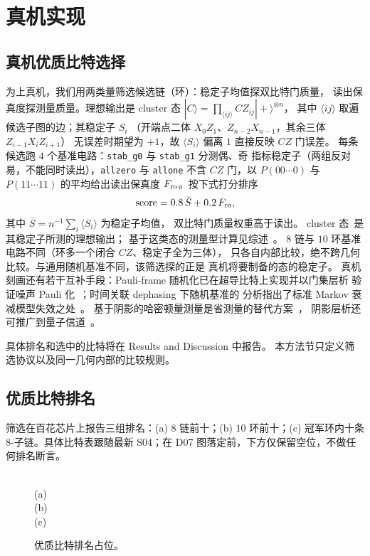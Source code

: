 \section{真机实现}
\label{sec:hardware}

\subsection{真机优质比特选择}
\label{sec:premium}

为上真机，我们用两类量筛选候选链（环）：稳定子均值探双比特门质量，
读出保真度探测量质量。理想输出是 cluster 态
$|C\rangle=\prod_{\langle ij\rangle}CZ_{ij}|+\rangle^{\otimes n}$，
其中 $\langle ij\rangle$ 取遍候选子图的边；其稳定子 $S_i$
（开端点二体 $X_0Z_1$、$Z_{n-2}X_{n-1}$，其余三体 $Z_{i-1}X_iZ_{i+1}$）
无误差时期望为 $+1$，故 $\langle S_i\rangle$ 偏离 $1$ 直接反映 $CZ$ 门误差。
每条候选跑 $4$ 个基准电路：\texttt{stab\_g0} 与 \texttt{stab\_g1} 分测偶、奇
指标稳定子（两组反对易，不能同时读出），\texttt{allzero} 与 \texttt{allone}
不含 $CZ$ 门，以 $P(00\cdots0)$ 与 $P(11\cdots11)$ 的平均给出读出保真度
$F_{\rm ro}$。按下式打分排序
\begin{equation}
{\rm score}=0.8\,\bar{S}+0.2\,F_{\rm ro},
\end{equation}
其中 $\bar{S}=n^{-1}\sum_i\langle S_i\rangle$ 为稳定子均值，
双比特门质量权重高于读出。
cluster 态~\cite{raussendorf2001oneway}是其稳定子所测的理想输出；
基于这类态的测量型计算见综述~\cite{briegel2009measurement}。
$8$ 链与 $10$ 环基准电路不同（环多一个闭合 $CZ$、稳定子全为三体），
只各自内部比较，绝不跨几何比较。与通用随机基准不同，该筛选探的正是
真机将要制备的态的稳定子。
真机刻画还有若干互补手段：Pauli-frame 随机化已在超导比特上实现并以门集层析
验证噪声 Pauli 化~\cite{ware2021experimental}；时间关联 dephasing 下随机基准的
分析指出了标准 Markov 衰减模型失效之处~\cite{qi2021randomized}。
基于阴影的哈密顿量测量是省测量的替代方案~\cite{hadfield2022measurements,huang2021derandomization}，
阴影层析还可推广到量子信道~\cite{kunjummen2023shadow}。

具体排名和选中的比特将在 Results and Discussion 中报告。
本方法节只定义筛选协议以及同一几何内部的比较规则。

\subsection{优质比特排名}
\label{sec:rankings}

筛选在百花芯片上报告三组排名：(a) $8$ 链前十；(b) $10$ 环前十；(c) 冠军环内十条 $8$-子链。具体比特表跟随最新 S04；在 D07 图落定前，下方仅保留空位，不做任何排名断言。

\begin{figure}[htbp]
\centering
{}\\(a)
\\(b)
\\(c)
\caption{优质比特排名占位。\label{fig:D07}}
\end{figure}
